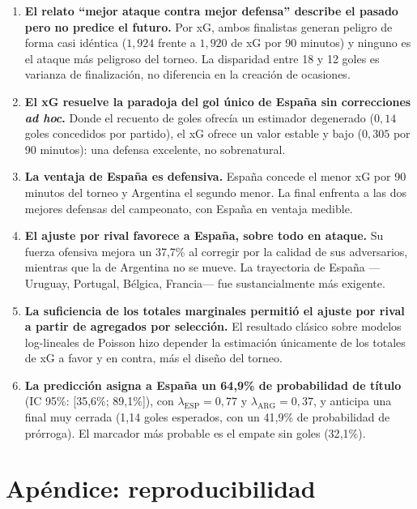 \documentclass[11pt,a4paper]{article}
\begin{document}
\begin{enumerate}
\item \textbf{El relato ``mejor ataque contra mejor defensa'' describe el pasado pero no predice el futuro.} Por xG, ambos finalistas generan peligro de forma casi idéntica ($1{,}924$ frente a $1{,}920$ de xG por 90 minutos) y ninguno es el ataque más peligroso del torneo. La disparidad entre 18 y 12 goles es varianza de finalización, no diferencia en la creación de ocasiones.

\item \textbf{El xG resuelve la paradoja del gol único de España sin correcciones \textit{ad hoc}.} Donde el recuento de goles ofrecía un estimador degenerado ($0{,}14$ goles concedidos por partido), el xG ofrece un valor estable y bajo ($0{,}305$ por 90 minutos): una defensa excelente, no sobrenatural.

\item \textbf{La ventaja de España es defensiva.} España concede el menor xG por 90 minutos del torneo y Argentina el segundo menor. La final enfrenta a las dos mejores defensas del campeonato, con España en ventaja medible.

\item \textbf{El ajuste por rival favorece a España, sobre todo en ataque.} Su fuerza ofensiva mejora un 37{,}7\% al corregir por la calidad de sus adversarios, mientras que la de Argentina no se mueve. La trayectoria de España ---Uruguay, Portugal, Bélgica, Francia--- fue sustancialmente más exigente.

\item \textbf{La suficiencia de los totales marginales permitió el ajuste por rival a partir de agregados por selección.} El resultado clásico sobre modelos log-lineales de Poisson \citep{birch1963} hizo depender la estimación únicamente de los totales de xG a favor y en contra, más el diseño del torneo.

\item \textbf{La predicción asigna a España un 64{,}9\% de probabilidad de título} (IC 95\%: [35{,}6\%; 89{,}1\%]), con $\lambda_{\text{ESP}} = 0{,}77$ y $\lambda_{\text{ARG}} = 0{,}37$, y anticipa una final muy cerrada (1{,}14 goles esperados, con un 41{,}9\% de probabilidad de prórroga). El marcador más probable es el empate sin goles (32{,}1\%).
\end{enumerate}

\section*{Apéndice: reproducibilidad}
\end{document}
